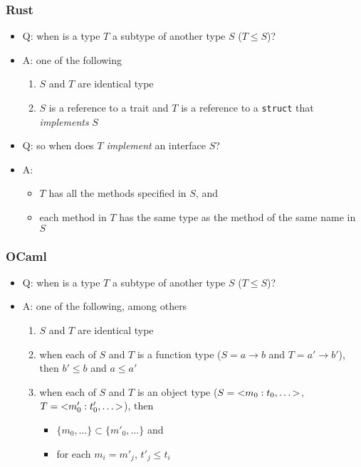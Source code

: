 \documentclass[12pt,dvipdfmx]{beamer}
\begin{document}
\begin{frame}
  \frametitle{Rust}
  \begin{itemize}
  \item<1-> Q: when is a type $T$ a subtype of another type $S$ ($T \leq S$)?
  \item<2-> A: one of the following
    \begin{enumerate}
    \item $S$ and $T$ are identical type
    \item $S$ is a reference to a trait and $T$ is a reference to a {\tt struct} that {\it implements} $S$
    \end{enumerate}
  \item<3-> Q: so when does $T$ {\it implement} an interface $S$?
  \item<4-> A:
    \begin{itemize}
    \item $T$ has all the methods specified in $S$, and 
    \item each method in $T$ has the same type as the method of the same name in $S$
    \end{itemize}
  \end{itemize}
\end{frame}

\begin{frame}
  \frametitle{OCaml}
  \begin{itemize}
  \item<1-> Q: when is a type $T$ a subtype of another type $S$ ($T \leq S$)?
  \item<2-> A: one of the following, among others
    \begin{enumerate}
    \item<2-> $S$ and $T$ are identical type
    \item<3-> when each of $S$ and $T$ is a function type ($S = a \rightarrow b$
      and $T = a' \rightarrow b'$), then $b' \leq b$ and $a \leq a'$
    \item<4-> when each of $S$ and $T$ is an object type ($S = {\tt <} m_0 : t_0, \ldots {\tt >}$,
      $T = {\tt <} m'_0 : t'_0, \ldots {\tt >}$), then
      \begin{itemize}
      \item $\{ m_0, \ldots \} \subset \{ m'_0, \ldots \}$ and 
      \item for each $m_i = m'_j$, $t'_j \leq t_i$
      \end{itemize}
    \end{enumerate}
  \end{itemize}
\end{frame}
\end{document}
